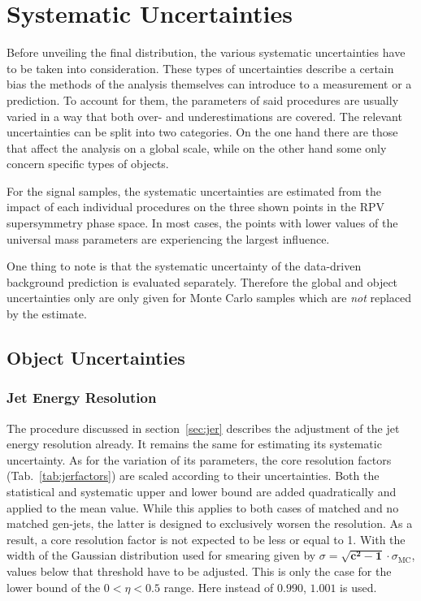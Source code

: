 \chapter{Systematic Uncertainties}
\label{cha:systematics}

Before unveiling the final distribution, the various systematic uncertainties have to be taken into consideration. These types of uncertainties describe a certain bias the methods of the analysis themselves can introduce to a measurement or a prediction. To account for them, the parameters of said procedures are usually varied in a way that both over- and underestimations are covered. The relevant uncertainties can be split into two categories. On the one hand there are those that affect the analysis on a global scale, while on the other hand some only concern specific types of objects.

For the signal samples, the systematic uncertainties are estimated from the impact of each individual procedures on the three shown points in the RPV supersymmetry phase space. In most cases, the points with lower values of the universal mass parameters are experiencing the largest influence. 

One thing to note is that the systematic uncertainty of the data-driven background prediction is evaluated separately. Therefore the global and object uncertainties only are only given for Monte Carlo samples which are \textit{not} replaced by the estimate.

\section{Object Uncertainties}
\label{sec:objsys}

\subsection{Jet Energy Resolution}
\label{sec:jersys}

The procedure discussed in section~\ref{sec:jer} describes the adjustment of the jet energy resolution already. It remains the same for estimating its systematic uncertainty. As for the variation of its parameters, the core resolution factors (Tab.~\ref{tab:jerfactors}) are scaled according to their uncertainties. Both the statistical and systematic upper and lower bound are added quadratically and applied to the mean value. While this applies to both cases of matched and no matched gen-jets, the latter is designed to exclusively worsen the resolution. As a result, a core resolution factor is not expected to be less or equal to 1. With the width of the Gaussian distribution used for smearing given by $\sigma = \mathbf{\sqrt{c^2-1}} \cdot \sigma_{\text{MC}}$, values below that threshold have to be adjusted. This is only the case for the lower bound of the $0 < \eta < 0.5$ range. Here instead of $0.990$, $1.001$ is used. 

